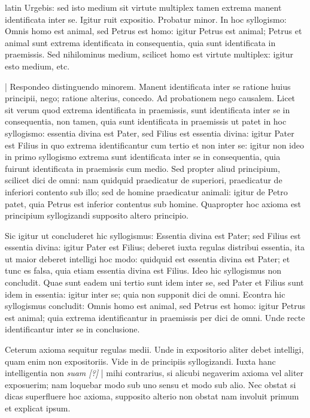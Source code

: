 \begin{otherlanguage*}{latin}
\pstart
 Urgebis: sed isto medium sit virtute multiplex tamen extrema manent identificata inter se. Igitur ruit expositio. Probatur minor. In hoc syllogismo: Omnis homo est animal, sed Petrus est homo: igitur Petrus est animal; Petrus et animal sunt extrema identificata in consequentia, quia sunt identificata in praemissis. Sed nihilominus medium, scilicet homo est virtute multiplex: igitur esto medium, etc. 
\pend

\pstart
 \textnormal{|} Respondeo distinguendo minorem. Manent identificata inter se ratione huius principii, nego; ratione alterius, concedo. Ad probationem nego causalem. Licet sit verum quod extrema identificata in praemissis, sunt identificata inter se in consequentia, non tamen, quia sunt identificata in praemissis ut patet in hoc syllogismo: essentia divina est Pater, sed Filius est essentia divina: igitur Pater est Filius in quo extrema identificantur cum tertio et non inter se: igitur non ideo in primo syllogismo extrema sunt identificata inter se in consequentia, quia fuirunt identificata in praemissis cum medio. Sed propter aliud principium, scilicet dici de omni: nam quidquid praedicatur de superiori, praedicatur de inferiori contento sub illo; sed de homine praedicatur animali: igitur de Petro patet, quia Petrus est inferior contentus sub homine. Quapropter hoc axioma est principium syllogizandi supposito altero principio. 
\pend

\pstart
 Sic igitur ut concluderet hic syllogismus: Essentia divina est Pater; sed Filius est essentia divina: igitur Pater est Filius; deberet iuxta regulas distribui essentia, ita ut maior deberet intelligi hoc modo: quidquid est essentia divina est Pater; et tunc es falsa, quia etiam essentia divina est Filius. Ideo hic syllogismus non concludit. Quae sunt eadem uni tertio sunt idem inter se, sed Pater et Filius sunt idem in essentia: igitur inter se; quia non supponit dici de omni. Econtra hic syllogismus concludit: Omnis homo est animal, sed Petrus est homo: igitur Petrus est animal; quia extrema identificantur in praemissis per dici de omni. Unde recte identificantur inter se in conclusione. 
\pend

\pstart
 Ceterum axioma sequitur regulas medii. Unde in expositorio aliter debet intelligi, quam enim non expositoriis. Vide in  de principiis syllogizandi. Iuxta hanc intelligentia non \emph{suam [?]} \textnormal{|}  mihi contrarius, si alicubi negaverim axioma vel aliter exposuerim; nam loquebar modo sub uno sensu et modo sub alio. Nec obstat si dicas superfluere hoc axioma, supposito alterio non obstat nam involuit primum et explicat ipsum. 
\pend


\end{otherlanguage*}
